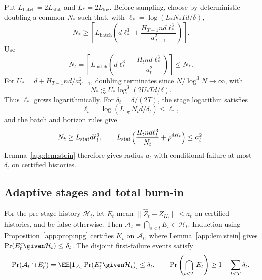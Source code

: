 Put $L_{\mathrm{batch}}=2L_{\mathrm{stat}}$ and $L_*=2L_{\log}$.
Before sampling, choose by deterministic doubling a common $N_*$
such that, with $\ell_*=\log(L_*N_*Td/\delta)$,
\[
 N_*\ge
 \left\lceil L_{\mathrm{batch}}
 \left(d\ell_*^3+\frac{H_{T-1}nd\ell_*^3}{a_{T-1}^2}\right)\right\rceil.
\]
Use
\begin{equation}\label{app:eq:batches}
 N_t=\left\lceil L_{\mathrm{batch}}
      \left(d\ell_*^3+\frac{H_tnd\ell_*^3}{a_t^2}\right)\right\rceil
 \le N_* .
\end{equation}
For $U_*=d+H_{T-1}nd/a_{T-1}^2$, doubling terminates since
$N/\log^3N\to\infty$, with
\[
 N_*\lesssim U_*\log^3(2U_*Td/\delta).
\]
Thus $\ell_*$ grows logarithmically. For $\delta_t=\delta/(2T)$, the
stage logarithm satisfies
\[
 \ell_t=\log(L_{\log}N_td/\delta_t)\le\ell_*,
\]
and the batch and horizon rules give
\[
 N_t\ge L_{\mathrm{stat}}d\ell_t^3,\qquad
 L_{\mathrm{stat}}\Bigl(\frac{H_tnd\ell_t^3}{N_t}+\rho^{4H_t}\Bigr)
 \le a_t^2.
\]
Lemma~\ref{app:lem:stein} therefore gives radius $a_t$ with conditional
failure at most $\delta_t$ on certified histories.

\subsection{Adaptive stages and total burn-in}\label{app:stages}

For the pre-stage history $\mathcal H_t$, let $E_t$ mean
$\|\widehat Z_t-Z_{K_t}\|\le a_t$ on certified histories, and be
false otherwise. Then $\mathcal A_t=\bigcap_{s<t}E_s\in\mathcal H_t$.
Induction using Proposition~\ref{app:prop:npg} certifies $K_t$ on
$\mathcal A_t$, where Lemma~\ref{app:lem:stein} gives
$\Pr(E_t^c\given\mathcal H_t)\le\delta_t$.
The disjoint first-failure events satisfy
\begin{equation}\label{app:eq:first-failure}
 \Pr(\mathcal A_t\cap E_t^c)
 =\EE[\mathbf1_{\mathcal A_t}\Pr(E_t^c\given\mathcal H_t)]
 \le\delta_t,\qquad
 \Pr\left(\bigcap_{t<T}E_t\right)\ge1-\sum_{t<T}\delta_t.
\end{equation}



